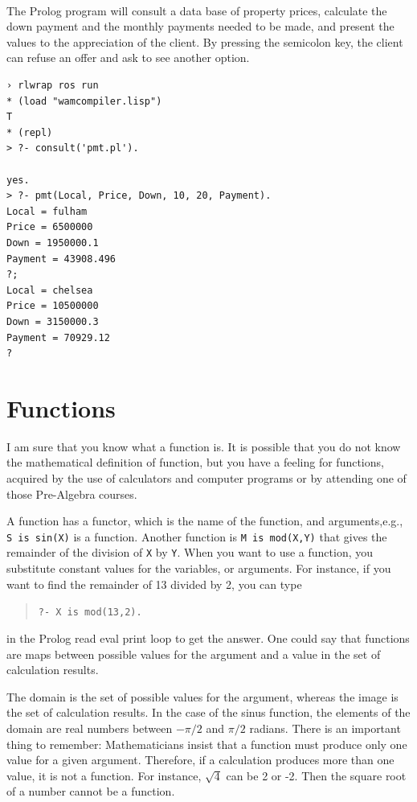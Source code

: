 \documentclass[a4paper,12pt]{book}
\begin{document}
\verb||\\
The Prolog program will consult a data base of
property prices, calculate the down payment and
the monthly payments needed to be made, and present the
values to the appreciation of the client. By pressing the
semicolon key, the client can refuse an offer and
ask to see another option.

\begin{verbatim}
› rlwrap ros run
* (load "wamcompiler.lisp")
T
* (repl)
> ?- consult('pmt.pl').

yes.
> ?- pmt(Local, Price, Down, 10, 20, Payment).
Local = fulham
Price = 6500000
Down = 1950000.1
Payment = 43908.496
?;
Local = chelsea
Price = 10500000
Down = 3150000.3
Payment = 70929.12
?
\end{verbatim}

\section{Functions}
I am sure that you know what a function is. It is
possible that you do not know the mathematical
definition of function, but you have a feeling
for functions, acquired by the use of calculators
and computer programs or by attending one of
those Pre-Algebra courses.

A function has a functor, which is the name of the
function, and arguments,e.g., \verb|S is sin(X)| is
a function. Another function is \verb|M is mod(X,Y)|
that gives the remainder of the division of \verb|X|
by \verb|Y|.  When you want to use a function, you
substitute constant values for the variables, or arguments.
For instance, if you want to find the remainder
of 13 divided by 2, you can type
\begin{quote}
	\verb|?- X is mod(13,2).|
\end{quote}
in the Prolog read eval print loop to get the
answer. One could say that functions are maps
between possible values for the argument and
a value in the set of calculation results.

The domain is the set of possible values for the
argument, whereas the image is the set of calculation
results. In the case of the sinus function,
the elements of the domain are real numbers
between $-\pi/2$ and $\pi/2$ radians. There
is an important thing to remember: 
Mathematicians insist that a function must produce
only one value for a given argument. Therefore,
if a calculation produces more than one value,
it is not a function. For instance, $\sqrt{4}$
can be 2 or -2. Then the square root of a number
cannot be a function. 
\end{document}
